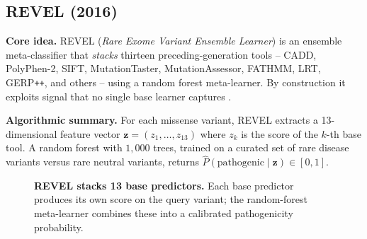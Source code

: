 \documentclass[11pt,a4paper,oneside]{report}
\begin{document}
\subsection{REVEL (2016) \texorpdfstring{\citep{ioannidis2016revel}}{(Ioannidis et al., 2016)}}
\label{sec:rw-revel}

\textbf{Core idea.} REVEL (\emph{Rare Exome Variant
Ensemble Learner}) is an ensemble meta-classifier that
\emph{stacks} thirteen preceding-generation tools --
CADD, PolyPhen-2, SIFT, MutationTaster, MutationAssessor,
FATHMM, LRT, GERP\texttt{++}, and others -- using a
random forest meta-learner. By construction it exploits
signal that no single base learner captures
\citep{ioannidis2016revel}.

\textbf{Algorithmic summary.} For each missense variant,
REVEL extracts a 13-dimensional feature vector
$\mathbf{z} = (z_1, \dots, z_{13})$ where $z_k$ is the
score of the $k$-th base tool. A random forest with
$1{,}000$ trees, trained on a curated set of rare
disease variants versus rare neutral variants, returns
$\widehat{P}(\text{pathogenic} \mid \mathbf{z}) \in [0,1]$.

\begin{figure}[htbp]
\centering
{}
\caption[REVEL pipeline]{\textbf{REVEL stacks 13 base
predictors.} Each base predictor produces its own score on
the query variant; the random-forest meta-learner combines
these into a calibrated pathogenicity probability.}
\label{fig:revel-pipeline}
\end{figure}
\end{document}
